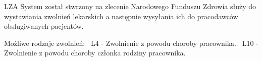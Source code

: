 L\+ZA System został stwrzony na zlecenie Narodowego Funduszu Zdrowia służy do wystawiania zwolnień lekarskich a następnie wysyłania ich do pracodawców obslugiwanych pacjentów.

Możliwe rodzaje zwolnień\+:~\newline
 L4 -\/ Zwolnienie z powodu choroby pracownika.~\newline
 L10 -\/ Zwolnienie z powodu choroby członka rodziny pracownika. 
